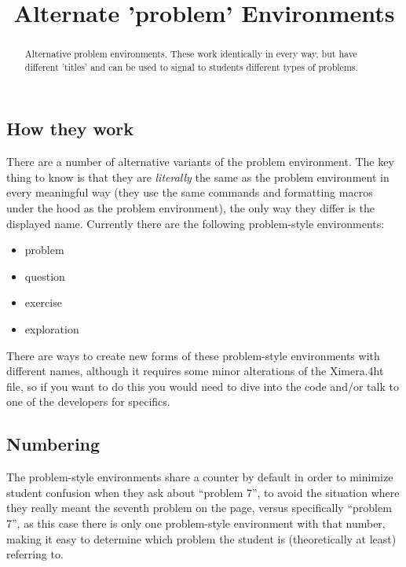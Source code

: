 \documentclass{ximera}
\title{Alternate 'problem' Environments}
\begin{document}
\begin{abstract}
    Alternative problem environments. These work identically in every way, but have different 'titles' and can be used to signal to students different types of problems.
\end{abstract}
\maketitle

    \subsection*{How they work}
        
        There are a number of alternative variants of the problem environment. The key thing to know is that they are \textit{literally} the same as the problem environment in every meaningful way (they use the same commands and formatting macros under the hood as the problem environment), the only way they differ is the displayed name. Currently there are the following problem-style environments:
        
        \begin{itemize}
            \item problem
            \item question
            \item exercise
            \item exploration
        \end{itemize}
        
        There are ways to create new forms of these problem-style environments with different names, although it requires some minor alterations of the Ximera.4ht file, so if you want to do this you would need to dive into the code and/or talk to one of the developers for specifics.
    
    \subsection*{Numbering}
    
        The problem-style environments share a counter by default in order to minimize student confusion when they ask about ``problem 7'', to avoid the situation where they really meant the seventh problem on the page, versus specifically ``problem 7'', as this case there is only one problem-style environment with that number, making it easy to determine which problem the student is (theoretically at least) referring to.
    
\end{document}
